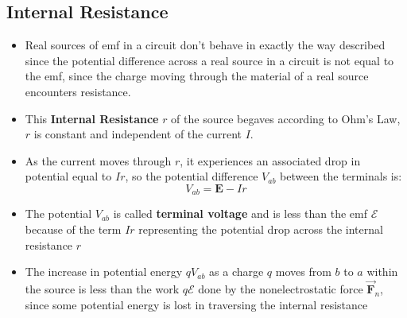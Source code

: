 \documentclass[11pt, a4paper]{article}
\begin{document}
\subsection{Internal Resistance}
\begin{itemize}
    \item Real sources of emf in a circuit don't behave in exactly the way described
        since the potential difference across a real source in a circuit is not equal to
        the emf, since the charge moving through the material of a real source
        encounters resistance.
    \item This \textbf{Internal Resistance} $r$ of the source begaves according to Ohm's
        Law, $r$ is constant and independent of the current $I$.
    \item As the current moves through $r$, it experiences an associated drop in
        potential equal to $Ir$, so the potential difference $V_{ab}$ between the
        terminals is:
        \begin{equation}
            V_{ab} = \mathbf{E} - Ir
        \end{equation}
    \item The potential $V_{ab}$ is called \textbf{terminal voltage} and is less than the
        emf $\mathcal{E}$ because of the term $Ir$ representing the potential drop
        across the internal resistance $r$
    \item The increase in potential energy $qV_{ab}$ as a charge $q$ moves from $b$ to
        $a$ within the source is less than the work $q\mathcal{E}$ done by the
        nonelectrostatic force $\vec{\mathbf{F}}_n$, since some potential energy is lost
        in traversing the internal resistance
\end{itemize}
\end{document}

